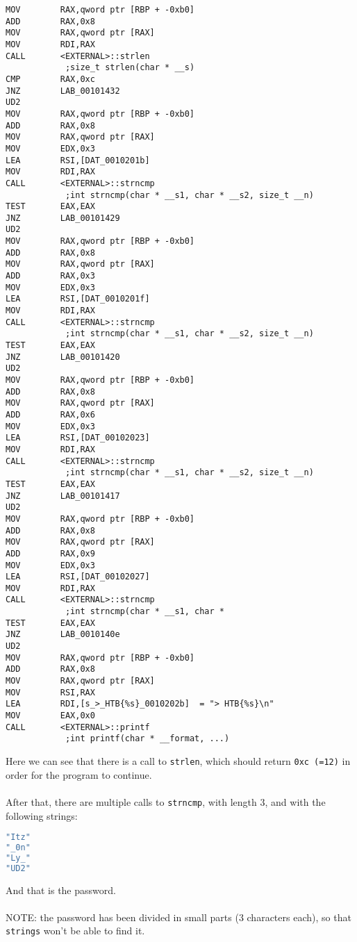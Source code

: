 \documentclass{article}
\begin{document}
\begin{lstlisting}
MOV        RAX,qword ptr [RBP + -0xb0]
ADD        RAX,0x8
MOV        RAX,qword ptr [RAX]
MOV        RDI,RAX
CALL       <EXTERNAL>::strlen                 
            ;size_t strlen(char * __s)
CMP        RAX,0xc
JNZ        LAB_00101432
UD2
MOV        RAX,qword ptr [RBP + -0xb0]
ADD        RAX,0x8
MOV        RAX,qword ptr [RAX]
MOV        EDX,0x3
LEA        RSI,[DAT_0010201b]
MOV        RDI,RAX
CALL       <EXTERNAL>::strncmp
            ;int strncmp(char * __s1, char * __s2, size_t __n)
TEST       EAX,EAX
JNZ        LAB_00101429
UD2
MOV        RAX,qword ptr [RBP + -0xb0]
ADD        RAX,0x8
MOV        RAX,qword ptr [RAX]
ADD        RAX,0x3
MOV        EDX,0x3
LEA        RSI,[DAT_0010201f]
MOV        RDI,RAX
CALL       <EXTERNAL>::strncmp
            ;int strncmp(char * __s1, char * __s2, size_t __n)
TEST       EAX,EAX
JNZ        LAB_00101420
UD2
MOV        RAX,qword ptr [RBP + -0xb0]
ADD        RAX,0x8
MOV        RAX,qword ptr [RAX]
ADD        RAX,0x6
MOV        EDX,0x3
LEA        RSI,[DAT_00102023]
MOV        RDI,RAX
CALL       <EXTERNAL>::strncmp
            ;int strncmp(char * __s1, char * __s2, size_t __n)
TEST       EAX,EAX
JNZ        LAB_00101417
UD2
MOV        RAX,qword ptr [RBP + -0xb0]
ADD        RAX,0x8
MOV        RAX,qword ptr [RAX]
ADD        RAX,0x9
MOV        EDX,0x3
LEA        RSI,[DAT_00102027]
MOV        RDI,RAX
CALL       <EXTERNAL>::strncmp
            ;int strncmp(char * __s1, char * 
TEST       EAX,EAX
JNZ        LAB_0010140e
UD2
MOV        RAX,qword ptr [RBP + -0xb0]
ADD        RAX,0x8
MOV        RAX,qword ptr [RAX]
MOV        RSI,RAX
LEA        RDI,[s_>_HTB{%s}_0010202b]  = "> HTB{%s}\n"
MOV        EAX,0x0
CALL       <EXTERNAL>::printf
            ;int printf(char * __format, ...)
\end{lstlisting}

\noindent
Here we can see that there is a call to \texttt{strlen}, which should return \texttt{0xc (=12)}
in order for the program to continue.\\
\\
After that, there are multiple calls to \texttt{strncmp}, with length 3, and with the following strings:
\begin{lstlisting}[language=c]
"Itz"
"_0n"
"Ly_"
"UD2"
\end{lstlisting}

\noindent
And that is the password.\\
\\
NOTE: the password has been divided in small parts (3 characters each), so that \texttt{strings}
won't be able to find it.\\
\end{document}
